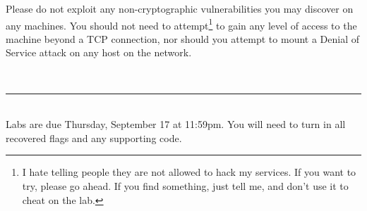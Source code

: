 \documentclass[11pt,oneside]{article}
\newcommand{\sectionfont}{phv} %
\renewcommand{\section}[1] {
    \vspace{12pt}{\quad\fontfamily{\sectionfont}\selectfont\Large\scshape\textbf{#1}}\\[-10pt]
    \vspace{8pt}\rule{\textwidth}{1pt}\\[-16pt]

}
\begin{document}
Please do not exploit any non-cryptographic vulnerabilities you may discover on
any machines. You should not need to attempt\footnote{I hate telling people they
are not allowed to hack my services. If you want to try, please go ahead. If you
find something, just tell me, and don't use it to cheat on the lab.} to gain any
level of access to the machine beyond a TCP connection, nor should you attempt
to mount a Denial of Service attack on any host on the network.

\section{Grading}
Labs are due Thursday, September 17 at 11:59pm. You will need to turn in all
recovered flags and any supporting code.
\end{document}
